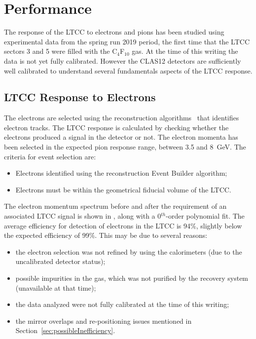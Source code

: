 \section{Performance}

The response of the LTCC to electrons and pions has been studied using experimental data from the spring run
2019 period, the first time that the LTCC sectors 3 and 5 were filled with the C$_4$F$_{10}$ gas. At the time
of this writing the data is not yet fully calibrated. However the CLAS12 detectors are sufficiently well calibrated
to understand several fundamentals aspects of the LTCC response.

\subsection{LTCC Response to Electrons}
\label{sec:elecResponse}

The electrons are selected using the reconstruction algorithms~\cite{recon-nim} that identifies electron tracks. The
LTCC response is calculated by checking whether the electrons produced a signal in the detector or not. The electron
momenta has been selected in the expected pion response range, between 3.5 and 8~GeV. The criteria for event
selection are:

\begin{itemize}
\item  Electrons identified using the reconstruction Event Builder algorithm;
\item Electrons must be within the geometrical fiducial volume of the LTCC.
\end{itemize}


The electron momentum spectrum before and after the requirement of an associated LTCC signal is shown in
, along with a 0$^{th}$-order polynomial fit. The average efficiency for detection of
electrons in the LTCC is 94$\%$, slightly below the expected efficiency of 99$\%$. This may be due to
several reasons:

\begin{itemize}
\item the electron selection was not refined by using the calorimeters (due to the uncalibrated detector status);
\item possible impurities in the gas, which was not purified by the recovery system (unavailable at that time);
\item the data analyzed were not fully calibrated at the time of this writing;
\item the mirror overlaps and re-positioning issues mentioned in Section~\ref{sec:possibleInefficiency}.
\end{itemize}

